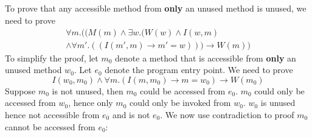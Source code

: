 \documentclass[a4paper]{article}
\begin{document}
\subsection{}
To prove that any accessible method from \textbf{only} an unused
method is unused, we need to prove
\begin{multline}
	\forall m.((M(m) \land \exists w.(W(w) \land I(w,m) \\
	\land \forall m'.((I(m', m) \rightarrow m'=w)))
	\rightarrow W(m))
\end{multline}
To simplify the proof, let $m_0$ denote a method that is
accessible from \textbf{only} an unused method
$w_0$. Let $e_0$ denote the program entry
point. We need to prove
\begin{equation}
	I(w_0, m_0) \land \forall m.(I(m, m_0) \rightarrow m = w_0) \rightarrow W(m_0)
\end{equation}
Suppose $m_0$ is not unused, then $m_0$
could be accessed from $e_0$. $m_0$ could
only be accessed from $w_0$, hence only
$m_0$ could only be invoked from $w_0$.
$w_0$ is unused hence not accessible from
$e_0$ and is not $e_0$. We now use
contradiction to proof $m_0$ cannot be accessed from
$e_0$:
\end{document}
